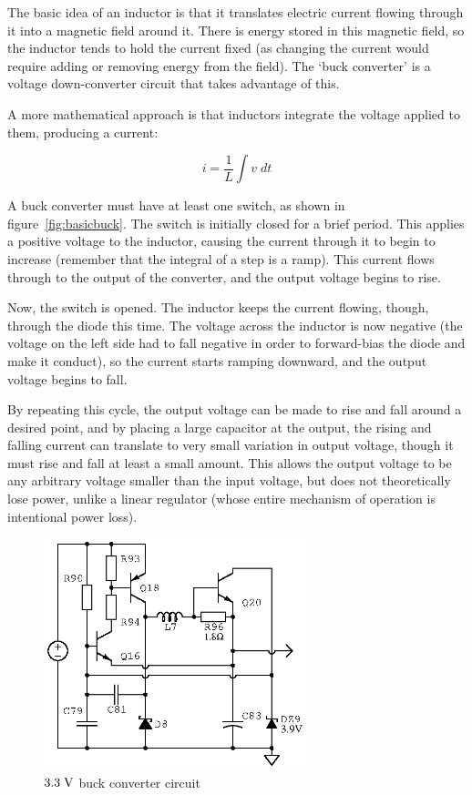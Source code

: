 The basic idea of an inductor is that it translates electric current flowing
through it into a magnetic field around it. There is energy stored in this
magnetic field, so the inductor tends to hold the current fixed (as changing
the current would require adding or removing energy from the field). The
`buck converter' is a voltage down-converter circuit that takes advantage
of this.

A more mathematical approach is that inductors integrate the voltage applied
to them, producing a current:

\begin{equation*}
    i = \frac{1}{L} \int v\;dt
\end{equation*}

A buck converter must have at least one switch, as shown in
figure~\ref{fig:basicbuck}.  The switch is initially closed for a brief period.
This applies a positive voltage to the inductor, causing the current through it
to begin to increase (remember that the integral of a step is a ramp). This
current flows through to the output of the converter, and the output voltage
begins to rise.

Now, the switch is opened. The inductor keeps the current flowing, though,
through the diode this time. The voltage across the inductor is now negative
(the voltage on the left side had to fall negative in order to forward-bias the
diode and make it conduct), so the current starts ramping downward, and the
output voltage begins to fall.~\cite[pp.~356--357]{aoe-vreg}

By repeating this cycle, the output voltage can be made to rise and fall around
a desired point, and by placing a large capacitor at the output, the rising and
falling current can translate to very small variation in output voltage, though
it must rise and fall at least a small amount. This allows the output voltage
to be any arbitrary voltage smaller than the input voltage, but does not
theoretically lose power, unlike a linear regulator (whose entire mechanism of
operation is intentional power loss).


\begin{figure}[H]
\centering
\includegraphics[width=3in]{3v3buck}
\caption{$3.3\;\mathrm{V}$ buck converter circuit}
\label{fig:3v3buck}
\end{figure}


